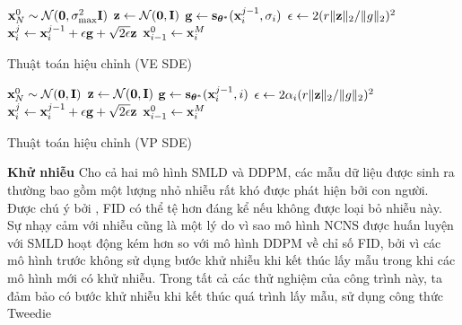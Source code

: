 \documentclass{article} %
\begin{document}
\begin{algorithm}[h!]
    \DontPrintSemicolon
    $\bold{x}_N^0 \sim \mathcal{N}(\bold{0}, \sigma_{\max}^2 \bold{I})$\;
     {
         {
            $\bold{z} \gets  \mathcal{N}(\bold{0}, \bold{I})$\;
            $\bold{g} \gets \bold{s}_{\boldsymbol{\theta}^{\ast}}(\bold{x}_i^{j-1}, \sigma_i)$\;
            $\epsilon \gets 2 (r \lVert \bold{z} \rVert_2 / \lVert g \rVert_2)^2$\;
            $\bold{x}_i^j \gets \bold{x}_i^{j-1} + \epsilon \bold{g} + \sqrt{2 \epsilon} \bold{z}$\;
        }
        $\bold{x}_{i-1}^0 \gets \bold{x}_i^M$\;
    }
    \;
    \caption{Thuật toán hiệu chỉnh (VE SDE)}
    \label{alg:4}
\end{algorithm}

\begin{algorithm}[h!]
    \DontPrintSemicolon
    $\bold{x}_N^0 \sim \mathcal{N}(\bold{0}, \bold{I})$\;
     {
         {
            $\bold{z} \gets  \mathcal{N}(\bold{0}, \bold{I})$\;
            $\bold{g} \gets \bold{s}_{\boldsymbol{\theta}^{\ast}}(\bold{x}_i^{j-1}, i)$\;
            $\epsilon \gets 2 \alpha_i (r \lVert \bold{z} \rVert_2 / \lVert g \rVert_2)^2$\;
            $\bold{x}_i^j \gets \bold{x}_i^{j-1} + \epsilon \bold{g} + \sqrt{2 \epsilon} \bold{z}$\;
        }
        $\bold{x}_{i-1}^0 \gets \bold{x}_i^M$\;
    }
    \;
    \caption{Thuật toán hiệu chỉnh (VP SDE)}
    \label{alg:5}
\end{algorithm}

\textbf{Khử nhiễu} Cho cả hai mô hình SMLD và DDPM, các mẫu dữ liệu được sinh ra thường bao gồm một lượng nhỏ nhiễu rất khó được phát hiện bởi con người.
Được chú ý bởi \cite{jolicoeur2020adversarial}, FID có thể tệ hơn đáng kể nếu không được loại bỏ nhiễu này.
Sự nhạy cảm với nhiễu cũng là một lý do vì sao mô hình NCNS được huấn luyện với SMLD hoạt động kém hơn so với mô hình DDPM về chỉ số FID, bởi vì các mô hình trước không sử dụng bước khử nhiễu khi kết thúc lấy mẫu trong khi các mô hình mới có khử nhiễu.
Trong tất cả các thử nghiệm của công trình này, ta đảm bảo có bước khử nhiễu khi kết thúc quá trình lấy mẫu, sử dụng công thức Tweedie \cite{efron2011tweedie}
\end{document}
